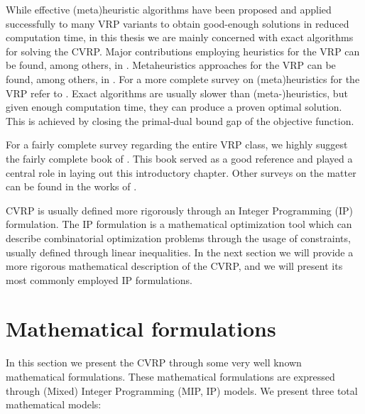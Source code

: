 While effective (meta)heuristic algorithms have been proposed and applied
successfully to many VRP variants to obtain good-enough solutions
in reduced computation time, in this thesis we are mainly concerned
with exact algorithms for solving the CVRP.
Major contributions employing heuristics for the VRP can be found, among others, in
\textcite{clarke1964scheduling, desrochers1989matching, paessens1988savings, foster1976integer}.
Metaheuristics approaches for the VRP can be found, among others, in
\textcite{gendreau1994tabu, cordeau2012parallel, toth2003granular, li2005very, pisinger2007, kytojoki2007efficient, nagata2009,vidal2012, subramanian2013}.
For a more complete survey on (meta)heuristics for the VRP refer to
\textcite{golden1998impact,gendreau2002metaheuristics,gendreau2008,laporte2014chapter,elshaer2020taxonomic}.
Exact algorithms are usually slower than (meta-)heuristics, but given
enough computation time, they can produce a proven optimal solution.
This is achieved by closing the primal-dual bound gap of the objective function.

\medskip

For a fairly complete survey regarding the entire VRP class, we highly suggest
the fairly complete book  of \textcite{toth2014}.
This book served as a good reference and played a central role
in laying out this introductory chapter.
Other surveys on the matter can be found in the works of \textcite{cordeau2007, baldacci2012, caceres-cruz2015, costa2019}.

\medskip


CVRP is usually defined more rigorously through an Integer Programming (IP) formulation.
The IP formulation is a mathematical optimization tool
which can describe combinatorial optimization problems
through the usage of constraints, usually defined through linear inequalities.
In the next section we will provide a more rigorous mathematical
description of the CVRP, and we will present its most commonly employed IP formulations.


\section{Mathematical formulations}
\label{sec:intro-cvrp-mathematical-formulations}

In this section we present the CVRP through some very well known mathematical formulations.
These mathematical formulations are expressed through (Mixed) Integer Programming (MIP, IP)
models.
We present three total mathematical models:

